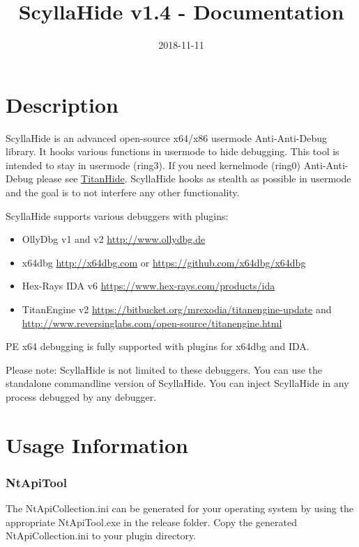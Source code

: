 \documentclass[10pt,a4paper]{article}
\title{ScyllaHide v1.4 - Documentation}
\author{}
\date{2018-11-11}
\begin{document}
\maketitle
 
\tableofcontents
\listoffigures
\lstlistoflistings

\newpage
{}

\section{Description}

ScyllaHide is an advanced open-source x64/x86 usermode Anti-Anti-Debug library. It hooks various functions in usermode to hide debugging. This tool is intended to stay in usermode (ring3). If you need kernelmode (ring0) Anti-Anti-Debug please see \href{https://github.com/mrexodia/TitanHide}{TitanHide}. ScyllaHide hooks as stealth as possible in usermode and the goal is to not interfere any other functionality.

ScyllaHide supports various debuggers with plugins:
\begin{itemize}
\item OllyDbg v1 and v2 \url{http://www.ollydbg.de}
\item x64dbg \url{http://x64dbg.com} or \url{https://github.com/x64dbg/x64dbg}
\item Hex-Rays IDA v6 \url{https://www.hex-rays.com/products/ida}
\item TitanEngine v2 \url{https://bitbucket.org/mrexodia/titanengine-update} and \url{http://www.reversinglabs.com/open-source/titanengine.html}
\end{itemize}

PE x64 debugging is fully supported with plugins for x64dbg and IDA.

Please note: ScyllaHide is not limited to these debuggers. You can use the standalone commandline version of ScyllaHide. You can inject ScyllaHide in any process debugged by any debugger.

\section{Usage Information}
\subsubsection{NtApiTool}
The NtApiCollection.ini can be generated for your operating system by using the appropriate NtApiTool.exe in the release folder. Copy the generated NtApiCollection.ini to your plugin directory.
\end{document}
